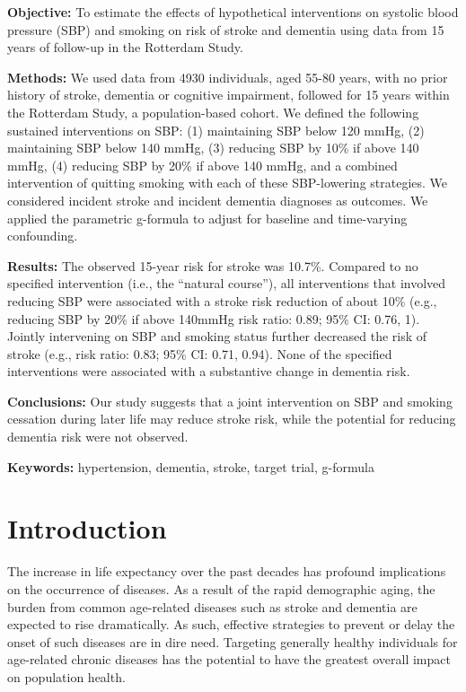 \documentclass[
]{book}
\begin{document}
\textbf{Objective:} To estimate the effects of hypothetical interventions on systolic blood pressure (SBP) and smoking on risk of stroke and dementia using data from 15 years of follow-up in the Rotterdam Study.

\textbf{Methods:} We used data from 4930 individuals, aged 55-80 years, with no prior history of stroke, dementia or cognitive impairment, followed for 15 years within the Rotterdam Study, a population-based cohort. We defined the following sustained interventions on SBP: (1) maintaining SBP below 120 mmHg, (2) maintaining SBP below 140 mmHg, (3) reducing SBP by 10\% if above 140 mmHg, (4) reducing SBP by 20\% if above 140 mmHg, and a combined intervention of quitting smoking with each of these SBP-lowering strategies. We considered incident stroke and incident dementia diagnoses as outcomes. We applied the parametric g-formula to adjust for baseline and time-varying confounding.

\textbf{Results:} The observed 15-year risk for stroke was 10.7\%. Compared to no specified intervention (i.e., the ``natural course''), all interventions that involved reducing SBP were associated with a stroke risk reduction of about 10\% (e.g., reducing SBP by 20\% if above 140mmHg risk ratio: 0.89; 95\% CI: 0.76, 1). Jointly intervening on SBP and smoking status further decreased the risk of stroke (e.g., risk ratio: 0.83; 95\% CI: 0.71, 0.94). None of the specified interventions were associated with a substantive change in dementia risk.

\textbf{Conclusions:} Our study suggests that a joint intervention on SBP and smoking cessation during later life may reduce stroke risk, while the potential for reducing dementia risk were not observed.

\textbf{Keywords:} hypertension, dementia, stroke, target trial, g-formula

\newpage

\hypertarget{introduction-1}{%
\section{Introduction}\label{introduction-1}}

The increase in life expectancy over the past decades has profound implications on the occurrence of diseases. As a result of the rapid demographic aging, the burden from common age-related diseases such as stroke and dementia are expected to rise dramatically\autocite{larson2008}. As such, effective strategies to prevent or delay the onset of such diseases are in dire need. Targeting generally healthy individuals for age-related chronic diseases has the potential to have the greatest overall impact on population health\autocite{bauer2014}.
\end{document}
